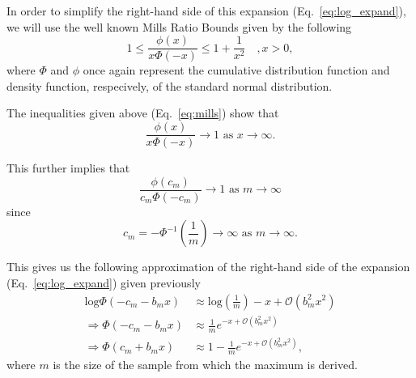 \documentclass[aoas]{imsart}
\begin{document}
In order to simplify the right-hand side of this expansion (Eq.~\ref{eq:log_expand}), we will use the well known Mills Ratio Bounds \cite{chatterjee2014} given by the following
%
\begin{equation}\label{eq:mills}
1 \leq \frac{\phi(x)}{x \Phi(-x)} \leq 1 + \frac{1}{x^2} \quad , x > 0,
\end{equation}
%
where $\Phi$ and $\phi$ once again represent the cumulative distribution function and density function, respecively, of the standard normal distribution.

The inequalities given above (Eq.~\ref{eq:mills}) show that 
%
\[\frac{\phi(x)}{x \Phi(-x)} \rightarrow 1 \text{ as } x \rightarrow \infty.
\] 

This further implies that 
%
\[
\frac{\phi(c_m)}{c_m \Phi(-c_m)} \rightarrow 1 \text{ as } m \rightarrow \infty
\] 
%
since 
%
\[
c_m = -\Phi^{-1}\left(\frac{1}{m}\right) \rightarrow \infty \text{ as } m \rightarrow \infty.
\] 

This gives us the following approximation of the right-hand side of the expansion (Eq.~\ref{eq:log_expand}) given previously
%
\begin{equation}\label{eq:approx_log_expand}
\begin{aligned}
\text{log}\Phi(-c_m - b_m x) &\approx \text{log}\left(\frac{1}{m}\right) - x + \mathcal{O}(b^2_m x^2) \\
\Rightarrow \Phi(-c_m - b_m x) &\approx \frac{1}{m}e^{-x + \mathcal{O}(b^2_m x^2)} \\
\Rightarrow \Phi(c_m + b_m x) &\approx 1 - \frac{1}{m}e^{-x + \mathcal{O}(b^2_m x^2)},
\end{aligned}
\end{equation}
%
where $m$ is the size of the sample from which the maximum is derived.
\end{document}
